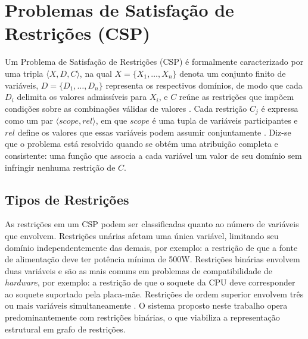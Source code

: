 \section{Problemas de Satisfação de Restrições (CSP)}
\label{sec:csp}

Um Problema de Satisfação de Restrições (CSP) é formalmente caracterizado
por uma tripla $\langle X, D, C \rangle$, na qual $X = \{X_1, \ldots, X_n\}$
denota um conjunto finito de variáveis, $D = \{D_1, \ldots, D_n\}$ representa
os respectivos domínios, de modo que cada $D_i$ delimita os valores admissíveis
para $X_i$, e $C$ reúne as restrições que impõem condições sobre as combinações
válidas de valores \cite{Russell2010}. Cada restrição $C_j$ é expressa como um
par $\langle \textit{scope}, \textit{rel} \rangle$, em que $\textit{scope}$ é
uma tupla de variáveis participantes e $\textit{rel}$ define os valores que
essas variáveis podem assumir conjuntamente \cite{Russell2010}. Diz-se que o
problema está resolvido quando se obtém uma atribuição completa e consistente:
uma função que associa a cada variável um valor de seu domínio sem infringir
nenhuma restrição de $C$.

\subsection{Tipos de Restrições}
As restrições em um CSP podem ser classificadas quanto ao número de variáveis
que envolvem. Restrições unárias afetam uma única variável, limitando seu domínio
independentemente das demais, por exemplo: a restrição de que a fonte de alimentação deve
ter potência mínima de 500W. Restrições binárias envolvem duas variáveis e são as mais comuns
em problemas de compatibilidade de \textit{hardware}, por exemplo: a restrição de que o soquete
da CPU deve corresponder ao soquete suportado pela placa-mãe. Restrições de ordem superior envolvem
três ou mais variáveis simultaneamente \cite{Dechter2003}. O sistema proposto neste trabalho
opera predominantemente com restrições binárias, o que viabiliza a representação estrutural
em grafo de restrições.

